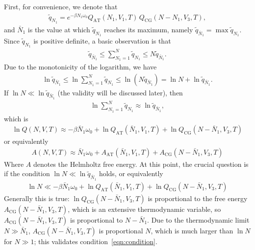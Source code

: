 \documentclass[aip,jcp,a4paper,reprint,onecolumn]{revtex4-1}
\newcommand{\redc}[1]{{\color{red} #1}}
\newcommand{\AT}{{\textrm{{AT}}}}
\newcommand{\CG}{{\textrm{CG}}}
\begin{document}
First, for convenience, we denote that
\begin{align}
  \tilde q_{N_1} = 
  e^{-\beta N_1\omega_0}
  Q_{\AT}(N_1, V_1, T)\,
  Q_{\CG}(N - N_1, V_3, T),
\end{align}
and $\bar N_1$ is the value at which $\tilde q_{N_1}$ reaches
its maximum, namely $\tilde q_{\bar N_1} = \max \tilde q_{N_1}$.
Since $\tilde q_{N_1}$ is positive definite, a basic
observation is that
\begin{align}
  \tilde q_{\bar N_1}
  \leq
  \sum_{N_1=1}^N \tilde q_{N_1}
  \leq
  N \tilde q_{\bar N_1}. 
\end{align}
Due to the monotonicity of the logarithm, we have
\begin{align}
  \ln\tilde q_{\bar N_1}
  \leq
  \ln\sum_{N_1=1}^N \tilde q_{N_1}
  \leq
  \ln (N \tilde q_{\bar N_1})
  =
  \ln N + \ln\tilde q_{\bar N_1}.
\end{align}
If $\ln N \ll \ln \tilde q_{\bar N_1}$ (the validity will be discussed
later), then 
\begin{align}
  \ln\sum_{N_1=1}^N \tilde q_{N_1}
  \approx
  \ln\tilde q_{\bar N_1},
\end{align}
which is
\begin{align}
  \ln Q(N, V, T)
  \approx
  -\beta \bar N_1\omega_0 + 
  \ln Q_{\AT}(\bar N_1, V_1, T) + \ln Q_{\CG}(N - \bar N_1, V_3, T)
\end{align}
or equivalently
\begin{align}\label{eqn:a-energy-1}
  A(N, V, T)
  \approx
  \bar N_1\omega_0 +
  A_{\AT}(\bar N_1, V_1, T) + A_{\CG}(N - \bar N_1, V_3, T)
\end{align}
Where $A$ denotes the Helmholtz free energy. 
At this point, the crucial question is if the condition $\ln N \ll \ln \tilde q_{\bar N_1}$
holds, or equivalently
\begin{align}\label{eqn:condition}
  \ln N 
  \ll
  -\beta \bar N_1\omega_0 +
  \ln Q_{\AT}(\bar N_1, V_1, T) + \ln Q_{\CG}(N - \bar N_1, V_3, T)
\end{align}
Generally this is true: $\ln Q_{\CG}(N - \bar N_1, V_3, T)$
is proportional to the free energy $A_{\CG}(N - \bar N_1, V_3, T)$,
which is an extensive thermodynamic variable, so
$A_{\CG}(N - \bar N_1, V_3, T)$ is proportional to $N-\bar N_1$.
Due to the thermodynamic limit $N \gg \bar N_1$,
$A_{\CG}(N - \bar N_1, V_3, T)$ \redc{is proportional $N$, which
is much larger than $\ln N$ for $N\gg 1$}; this
validates condition~\eqref{eqn:condition}.
\end{document}
